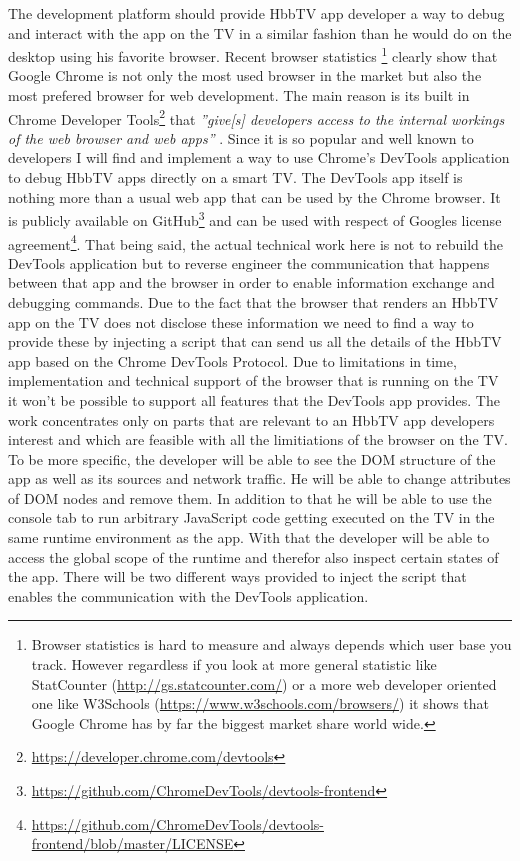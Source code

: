 The development platform should provide HbbTV app developer a way to debug and interact with the app on the
TV in a similar fashion than he would do on the desktop using his favorite browser. Recent browser statistics
\footnote{Browser statistics is hard to measure and always depends which user base you track. However regardless
if you look at more general statistic like StatCounter (\url{http://gs.statcounter.com/}) or a more web developer
oriented one like W3Schools (\url{https://www.w3schools.com/browsers/}) it shows that Google Chrome has by far
the biggest market share world wide.} clearly show that Google Chrome is not only the most used browser in the
market but also the most prefered browser for web development. The main reason is its built in Chrome Developer
Tools\footnote{\url{https://developer.chrome.com/devtools}} that \textit{''give[s] developers access to the internal
workings of the web browser and web apps''} \cite{devtools}. Since it is so popular and well known to developers
I will find and implement a way to use Chrome's DevTools application to debug HbbTV apps directly on a smart TV.
The DevTools app itself is nothing more than a usual web app that can be used by the Chrome browser. It is
publicly available on GitHub\footnote{\url{https://github.com/ChromeDevTools/devtools-frontend}} and can be used
with respect of Googles license agreement\footnote{\url{https://github.com/ChromeDevTools/devtools-frontend/blob/master/LICENSE}}.
That being said, the actual technical work here is not to rebuild the DevTools application but to reverse
engineer the communication that happens between that app and the browser in order to enable information exchange
and debugging commands. Due to the fact that the browser that renders an HbbTV app on the TV does not disclose
these information we need to find a way to provide these by injecting a script that can send us all the details
of the HbbTV app based on the Chrome DevTools Protocol. Due to limitations in time, implementation and
technical support of the browser that is running on the TV it won't be possible to support all features
that the DevTools app provides. The work concentrates only on parts that are relevant to an HbbTV app developers
interest and which are feasible with all the limitiations of the browser on the TV. To be more specific,
the developer will be able to see the DOM structure of the app as well as its sources and network traffic.
He will be able to change attributes of DOM nodes and remove them. In addition to that he will be able to
use the console tab to run arbitrary JavaScript code getting executed on the TV in the same runtime environment
as the app. With that the developer will be able to access the global scope of the runtime and therefor
also inspect certain states of the app. There will be two different ways provided to inject the script that
enables the communication with the DevTools application.

